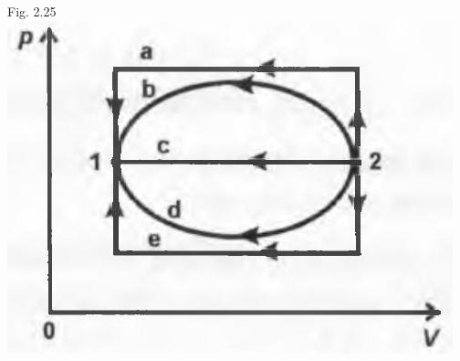 \documentclass[10pt]{article}
\begin{document}
Fig. 2.25\\
\includegraphics[max width=\textwidth, center]{2025_07_01_5b3ff9fa0d508c8e9f17g-111(1)}
\end{document}
